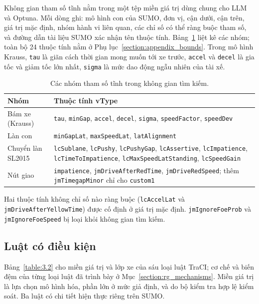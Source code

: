 \documentclass[../main.tex]{subfiles}
\begin{document}
Không gian tham số tĩnh nằm trong một tệp miền giá trị dùng chung cho LLM và Optuna. Mỗi dòng ghi: mô hình con của SUMO, đơn vị, cận dưới, cận trên, giá trị mặc định, nhóm hành vi liên quan, các chỉ số có thể ràng buộc tham số, và đường dẫn tài liệu SUMO xác nhận tên thuộc tính. Bảng~\ref{table:3.1b} liệt kê các nhóm; toàn bộ 24 thuộc tính nằm ở Phụ lục~\ref{section:appendix_bounds}. Trong mô hình Krauss, \texttt{tau} là giãn cách thời gian mong muốn tới xe trước, \texttt{accel} và \texttt{decel} là gia tốc và giảm tốc lớn nhất, \texttt{sigma} là mức dao động ngẫu nhiên của tài xế.

\begin{table}[!htbp]
\centering
\small
\caption{Các nhóm tham số tĩnh trong không gian tìm kiếm.}
\label{table:3.1b}
\begin{tabular}{|>{\raggedright\arraybackslash}p{4.2cm}|>{\raggedright\arraybackslash}p{9.8cm}|}
\hline
\textbf{Nhóm} & \textbf{Thuộc tính vType} \\
\hline
Bám xe (Krauss) & \texttt{tau}, \texttt{minGap}, \texttt{accel}, \texttt{decel}, \texttt{sigma}, \texttt{speedFactor}, \texttt{speedDev} \\
\hline
Làn con & \texttt{minGapLat}, \texttt{maxSpeedLat}, \texttt{latAlignment} \\
\hline
Chuyển làn SL2015 & \texttt{lcSublane}, \texttt{lcPushy}, \texttt{lcPushyGap}, \texttt{lcAssertive}, \texttt{lcImpatience}, \texttt{lcTimeToImpatience}, \texttt{lcMaxSpeedLatStanding}, \texttt{lcSpeedGain} \\
\hline
Nút giao & \texttt{impatience}, \texttt{jmDriveAfterRedTime}, \texttt{jmDriveRedSpeed}; thêm \texttt{jmTimegapMinor} chỉ cho \texttt{custom1} \\
\hline
\end{tabular}
\end{table}

Hai thuộc tính không chỉ số nào ràng buộc (\texttt{lcAccelLat} và \texttt{jmDrive\-After\-Yellow\-Time}) được cố định ở giá trị mặc định. \texttt{jmIgnoreFoeProb} và \texttt{jmIgnoreFoeSpeed} bị loại khỏi không gian tìm kiếm.

\subsection{Luật có điều kiện}
\label{subsection:impl_rules}

Bảng~\ref{table:3.2} cho miền giá trị và lớp xe của sáu loại luật TraCI; cơ chế và biến đệm của từng loại luật đã trình bày ở Mục~\ref{section:rg_mechanisms}. Miền giá trị là lựa chọn mô hình hóa, phần lớn ở mức giả định, và do bộ kiểm tra hợp lệ kiểm soát. Ba luật có chi tiết hiện thực riêng trên SUMO.
\end{document}
